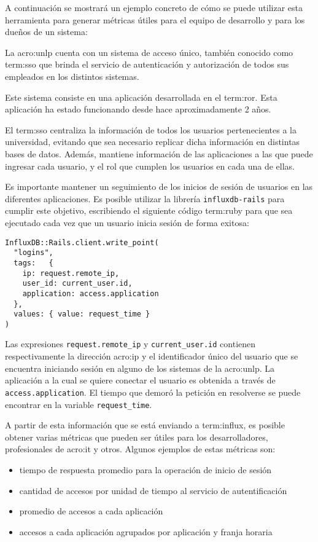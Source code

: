 A continuación se mostrará un ejemplo concreto de cómo se puede utilizar esta
herramienta para generar métricas útiles para el equipo de desarrollo y para
los dueños de un sistema:

La \gls{acro:unlp} cuenta con un sistema de acceso único, también conocido como
\gls{term:sso} que brinda el servicio de autenticación y autorización de todos
sus empleados en los distintos sistemas.

Este sistema consiste en una aplicación desarrollada en el 
\gls{term:ror}. Esta aplicación ha estado funcionando desde hace
aproximadamente 2 años.

El \gls{term:sso} centraliza la información de todos los usuarios
pertenecientes a la universidad, evitando que sea necesario replicar dicha
información en distintas bases de datos. Además, mantiene información de las
aplicaciones a las que puede ingresar cada usuario, y el rol que cumplen los
usuarios en cada una de ellas.

Es importante mantener un seguimiento de los inicios de sesión de usuarios en
las diferentes aplicaciones. Es posible utilizar la librería
\texttt{influxdb-rails} para cumplir este objetivo, escribiendo el siguiente
código \gls{term:ruby} para que sea ejecutado cada vez que un usuario inicia
sesión de forma exitosa:

\begin{lstlisting}
InfluxDB::Rails.client.write_point(
  "logins",
  tags:   { 
    ip: request.remote_ip,
    user_id: current_user.id,
    application: access.application
  },
  values: { value: request_time }
)
\end{lstlisting}

Las expresiones \lstinline{request.remote_ip} y \lstinline{current_user.id}
contienen respectivamente la dirección \gls{acro:ip} y el identificador único
del usuario que se encuentra iniciando sesión en alguno de los sistemas de la
\gls{acro:unlp}. La aplicación a la cual se quiere conectar el usuario es
obtenida a través de \lstinline{access.application}. El tiempo que demoró la
petición  en resolverse se puede encontrar en la variable
\lstinline{request_time}.

A partir de esta información que se está enviando a \gls{term:influx}, es
posible obtener varias métricas que pueden ser útiles para los desarrolladores,
profesionales de \gls{acro:it} y otros. Algunos ejemplos de estas métricas son:

\begin{itemize}
  \item tiempo de respuesta promedio para la operación de inicio de sesión
  \item cantidad de accesos por unidad de tiempo al servicio de autentificación
  \item promedio de accesos a cada aplicación
  \item accesos a cada aplicación agrupados por aplicación y franja horaria
\end{itemize}

